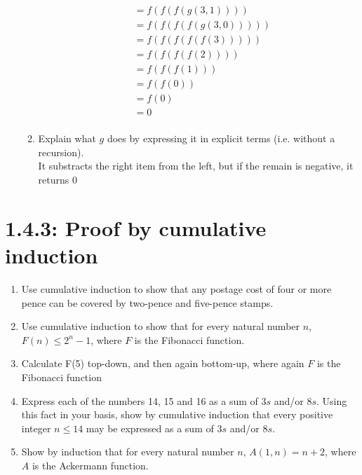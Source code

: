\documentclass{article}
\begin{document}
\begin{enumerate}
\begin{enumerate}
\begin{align*}
            &= f(f(f(g(3, 1))))\\
            &= f(f(f(f(g(3, 0)))))\\
            &= f(f(f(f(f(3)))))\\
            &= f(f(f(f(2))))\\
            &= f(f(f(1)))\\
            &= f(f(0))\\
            &= f(0)\\
            &= 0\\
        \end{align*}
        \item Explain what $g$ does by expressing it in explicit terms (i.e. without a recursion).\\
        It substracts the right item from the left, but if the remain is negative, it returns 0
    \end{enumerate}
\end{enumerate}

\section*{1.4.3: Proof by cumulative induction}
\begin{enumerate}
    \item Use cumulative induction to show that any postage cost of four or more pence can be covered by two-pence and five-pence stamps.
    \item Use cumulative induction to show that for every natural number $n$, $F(n) \leq 2^{n}-1$, where $F$ is the Fibonacci function.
    \item Calculate F(5) top-down, and then again bottom-up, where again $F$ is the Fibonacci function
    \item Express each of the numbers 14, 15 and 16 as a sum of $3s$ and/or $8s$. Using this fact in your basis, show by cumulative induction that every positive integer $n \leq 14$ may be expressed as a sum of $3s$ and/or $8s$.
    \item Show by induction that for every natural number $n$, $A(1,n) = n+2$, where $A$ is the Ackermann function.
\end{enumerate}
\end{document}
